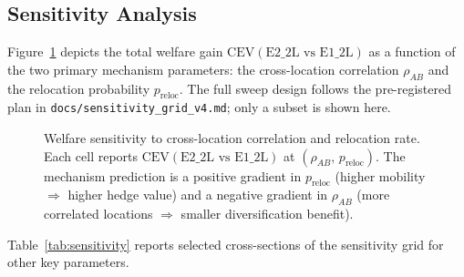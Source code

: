 \subsection{Sensitivity Analysis}
\label{sec:results:sensitivity}

Figure~\ref{fig:sensitivity_heatmap} depicts the total welfare gain
$\text{CEV}(\text{E2\_2L vs E1\_2L})$ as a function of the two primary
mechanism parameters: the cross-location correlation $\rho_{AB}$ and
the relocation probability $p_{\text{reloc}}$.
The full sweep design follows the pre-registered plan in
\texttt{docs/sensitivity\_grid\_v4.md}; only a subset is shown here.

\begin{figure}[t]
\centering
\caption{Welfare sensitivity to cross-location correlation and relocation rate.
         Each cell reports $\text{CEV}(\text{E2\_2L vs E1\_2L})$ at
         $(\rho_{AB},\, p_{\text{reloc}})$.
         The mechanism prediction is a positive gradient in $p_{\text{reloc}}$
         (higher mobility $\Rightarrow$ higher hedge value) and a negative
         gradient in $\rho_{AB}$ (more correlated locations $\Rightarrow$
         smaller diversification benefit).}
\label{fig:sensitivity_heatmap}
\end{figure}

Table~\ref{tab:sensitivity} reports selected cross-sections of the
sensitivity grid for other key parameters.

